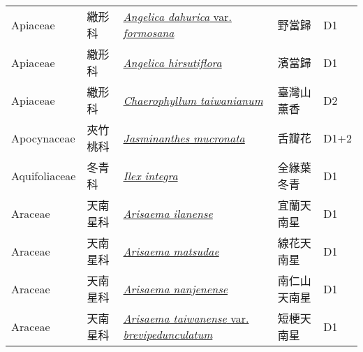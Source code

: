{\begin{longtable}{L{2.5cm}L{2cm}L{5cm}L{2.5cm}L{3cm}}
    Apiaceae & 繖形科 & \href{http://www.theplantlist.org/tpl1.1/search?q=Angelica+dahurica+var.+formosana}{\textit{Angelica dahurica} var. \textit{formosana} } & 野當歸 & D1    \\
    Apiaceae & 繖形科 & \href{http://www.theplantlist.org/tpl1.1/search?q=Angelica+hirsutiflora}{\textit{Angelica hirsutiflora} } & 濱當歸 & D1    \\
    Apiaceae & 繖形科 & \href{http://www.theplantlist.org/tpl1.1/search?q=Chaerophyllum+taiwanianum}{\textit{Chaerophyllum taiwanianum} } & 臺灣山薰香 & D2    \\
    Apocynaceae & 夾竹桃科 & \href{http://www.theplantlist.org/tpl1.1/search?q=Jasminanthes+mucronata}{\textit{Jasminanthes mucronata} } & 舌瓣花 & D1+2    \\
    Aquifoliaceae & 冬青科 & \href{http://www.theplantlist.org/tpl1.1/search?q=Ilex+integra}{\textit{Ilex integra} } & 全緣葉冬青 & D1    \\
    Araceae & 天南星科 & \href{http://www.theplantlist.org/tpl1.1/search?q=Arisaema+ilanense}{\textit{Arisaema ilanense} } & 宜蘭天南星 & D1    \\
    Araceae & 天南星科 & \href{http://www.theplantlist.org/tpl1.1/search?q=Arisaema+matsudae}{\textit{Arisaema matsudae} } & 線花天南星 & D1    \\
    Araceae & 天南星科 & \href{http://www.theplantlist.org/tpl1.1/search?q=Arisaema+nanjenense}{\textit{Arisaema nanjenense} } & 南仁山天南星 & D1    \\
    Araceae & 天南星科 & \href{http://www.theplantlist.org/tpl1.1/search?q=Arisaema+taiwanense+var.+brevipedunculatum}{\textit{Arisaema taiwanense} var. \textit{brevipedunculatum} } & 短梗天南星 & D1    \\

\end{longtable}}
